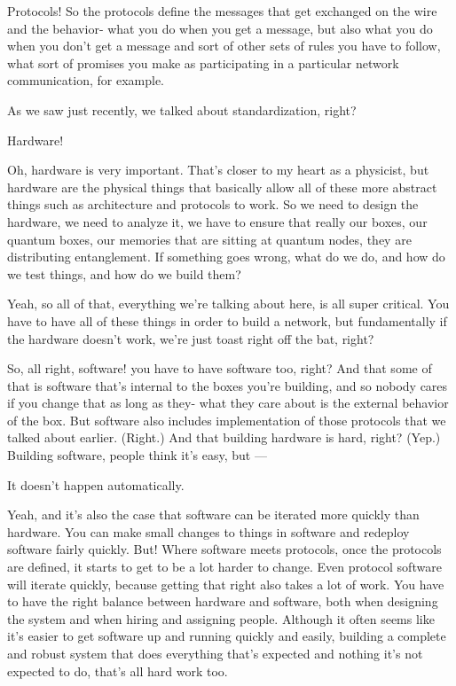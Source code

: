 Protocols! So the protocols define the messages that get exchanged on the wire and the behavior- what you do when you get a message, but also what you do when you don't get a message and sort of other sets of rules you have to follow, what sort of promises you make as participating in a particular network communication, for example.

As we saw just recently, we talked about standardization, right?

Hardware!

\mmm Oh, hardware is very important. That's closer to my heart as a physicist, but hardware are the physical things that basically allow all of these more abstract things such as architecture and protocols to work. So we need to design the hardware, we need to analyze it, we have to ensure that really our boxes, our quantum boxes, our memories that are sitting at quantum nodes, they are distributing entanglement. If something goes wrong, what do we do, and how do we test things, and how do we build them?

\rrr Yeah, so all of that, everything we're talking about here, is all super critical. You have to have all of these things in order to build a network, but fundamentally if the hardware doesn't work, we're just toast right off the bat, right?

So, all right, software! you have to have software too, right? And that some of that is software that's internal to the boxes you're building, and so nobody cares if you change that as long as they- what they care about is the external behavior of the box. But software also includes implementation of those protocols that we talked about earlier. (Right.) And that building hardware is hard, right? (Yep.) Building software, people think it's easy, but ---

\mmm It doesn't happen automatically.

\rrr Yeah, and it's also the case that software can be iterated more quickly than hardware. You can make small changes to things in software and redeploy software fairly quickly. But! Where software meets protocols, once the protocols are defined, it starts to get to be a lot harder to change. Even protocol software will iterate quickly, because getting that right also takes a lot of work. You have to have the right balance between hardware and software, both when designing the system and when hiring and assigning people. Although it often seems like it's easier to get software up and running quickly and easily, building a complete and robust system that does everything that's expected and nothing it's not expected to do, that's all hard work too. 

